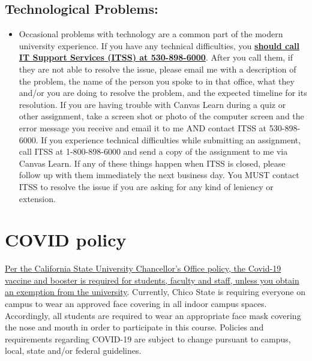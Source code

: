 \documentclass[11pt,]{article}
\providecommand{\tightlist}{%
  \setlength{\itemsep}{0pt}\setlength{\parskip}{0pt}}
\begin{document}
\hypertarget{technological-problems}{%
\subsection{Technological Problems:}\label{technological-problems}}

\begin{itemize}
\tightlist
\item
  Occasional problems with technology are a common part of the modern
  university experience. If you have any technical difficulties, you
  \href{https://www.csuchico.edu/itss/}{\textbf{should call IT Support
  Services (ITSS) at 530-898-6000}}. After you call them, if they are
  not able to resolve the issue, please email me with a description of
  the problem, the name of the person you spoke to in that office, what
  they and/or you are doing to resolve the problem, and the expected
  timeline for its resolution. If you are having trouble with Canvas
  Learn during a quiz or other assignment, take a screen shot or photo
  of the computer screen and the error message you receive and email it
  to me AND contact ITSS at 530-898-6000. If you experience technical
  difficulties while submitting an assignment, call ITSS at
  1-800-898-6000 and send a copy of the assignment to me via Canvas
  Learn. If any of these things happen when ITSS is closed, please
  follow up with them immediately the next business day. You MUST
  contact ITSS to resolve the issue if you are asking for any kind of
  leniency or extension.
\end{itemize}

\hypertarget{covid_policy}{%
\section{COVID policy}\label{covid_policy}}

\href{https://calstate.policystat.com/policy/11030468/latest/}{Per the
California State University Chancellor's Office policy, the Covid-19
vaccine and booster is required for students, faculty and staff, unless
you obtain an exemption from the university}. Currently, Chico State is
requiring everyone on campus to wear an approved face covering in all
indoor campus spaces. Accordingly, all students are required to wear an
appropriate face mask covering the nose and mouth in order to
participate in this course. Policies and requirements regarding COVID-19
are subject to change pursuant to campus, local, state and/or federal
guidelines.
\end{document}
